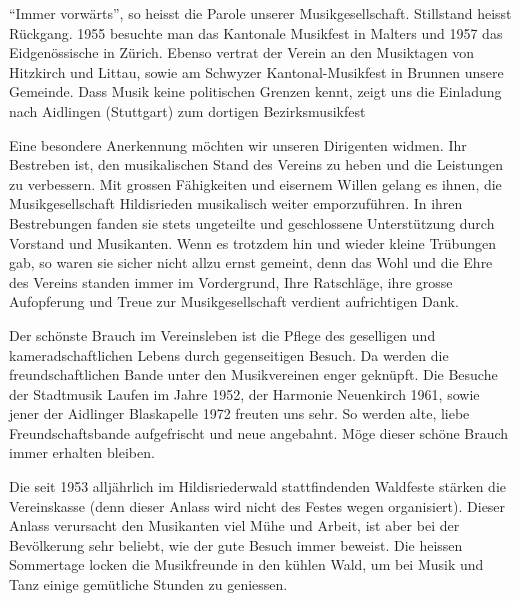 \begin{history}


    \enquote{Immer vorwärts}, so heisst die Parole unserer Musikgesellschaft.
    Stillstand heisst Rückgang. 1955 besuchte man das Kantonale Musikfest in
    Malters und 1957 das Eidgenössische in Zürich. Ebenso vertrat der Verein an
    den Musiktagen von Hitzkirch und Littau, sowie am Schwyzer
    Kantonal-Musikfest in Brunnen unsere Gemeinde. Dass Musik keine politischen
    Grenzen kennt, zeigt uns die Einladung nach Aidlingen (Stuttgart) zum
    dortigen Bezirksmusikfest

    Eine besondere Anerkennung möchten wir unseren Dirigenten widmen. Ihr
    Bestreben ist, den musikalischen Stand des Vereins zu heben und die
    Leistungen zu verbessern. Mit grossen Fähigkeiten und eisernem Willen gelang
    es ihnen, die Musikgesellschaft Hildisrieden musikalisch weiter
    emporzuführen. In ihren Bestrebungen fanden sie stets ungeteilte und
    geschlossene Unterstützung durch Vorstand und Musikanten. Wenn es trotzdem
    hin und wieder kleine Trübungen gab, so waren sie sicher nicht allzu ernst
    gemeint, denn das Wohl und die Ehre des Vereins standen immer im
    Vordergrund, Ihre Ratschläge, ihre grosse Aufopferung und Treue zur
    Musikgesellschaft verdient aufrichtigen Dank.

    Der schönste Brauch im Vereinsleben ist die Pflege des geselligen und
    kameradschaftlichen Lebens durch gegenseitigen Besuch. Da werden die
    freundschaftlichen Bande unter den Musikvereinen enger geknüpft. Die Besuche
    der Stadtmusik Laufen im Jahre 1952, der Harmonie Neuenkirch 1961, sowie
    jener der Aidlinger Blaskapelle 1972 freuten uns sehr. So werden alte, liebe
    Freundschaftsbande aufgefrischt und neue angebahnt. Möge dieser schöne
    Brauch immer erhalten bleiben.

    Die seit 1953 alljährlich im Hildisriederwald stattfindenden Waldfeste
    stärken die Vereinskasse (denn dieser Anlass wird nicht des Festes wegen
    organisiert). Dieser Anlass verursacht den Musikanten viel Mühe und Arbeit,
    ist aber bei der Bevölkerung sehr beliebt, wie der gute Besuch immer
    beweist. Die heissen Sommertage locken die Musikfreunde in den kühlen Wald,
    um bei Musik und Tanz einige gemütliche Stunden zu geniessen.


\end{history}
